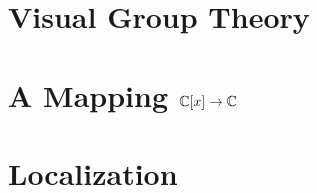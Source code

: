 \documentclass[12pt,openany]{book}
\begin{document}
	
	
	\tableofcontents
	\newpage
	\chapter{Visual Group Theory}
	
	
	\newpage
	\chapter{A Mapping $\mathbb{C}{[x]}\to\mathbb{C}$}
	
	
	\newpage
	\chapter{Localization}
	
	
	
	\newpage
	\appendix
%	
	
\end{document}
